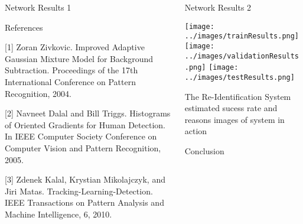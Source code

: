 \documentclass[final]{beamer}
\begin{document}
\begin{frame}{}
\begin{columns}[t]
\begin{column}{.49\linewidth}
        \begin{block}{Network Results 1}
		

        \end{block}
        
        \begin{block}{References}
		\scriptsize
		
[1] Zoran Zivkovic. Improved Adaptive Gaussian Mixture Model for Background Subtraction. Proceedings of the 17th International Conference on Pattern Recognition, 2004.
    
[2] Navneet Dalal and Bill Triggs. Histograms of Oriented Gradients for Human Detection. In IEEE Computer Society Conference on Computer Vision and Pattern Recognition, 2005.

[3] Zdenek Kalal, Krystian Mikolajczyk, and Jiri Matas. Tracking-Learning-Detection. IEEE Transactions on Pattern Analysis and Machine Intelligence, 6, 2010.
		
    \end{block}
    
    
	 \end{column}
	 \begin{column}{.49\linewidth}
 		\begin{block}{Network Results 2}
 		
 		\texttt{[image: ../images/trainResults.png]}  
 		\hspace{.001cm}
 		\texttt{[image: ../images/validationResults.png]}
 		\hspace{.001cm}
        \texttt{[image: ../images/testResults.png]}
        \end{block}
        
        \begin{block}{The Re-Identification System}
        estimated sucess rate and reasons
        images of system in action
       
 		\hspace{.7cm}
        
        
        \hspace{.7cm}
        \end{block}
        
       	\begin{block}{Conclusion}

        
        \end{block}

      \end{column}
    \end{columns}
     

  \end{frame}
\end{document}
